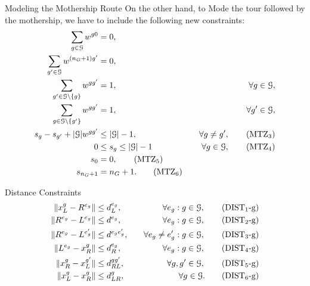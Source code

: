 \documentclass[slidestop,usepdftitle=false,10pt]{beamer}
\begin{document}
	\begin{frame}{Modeling the Mothership Route}
	On the other hand, to Mode the tour followed by the mothership, we have to include the following new constraints:
	    \begin{align}
	        \small
            \sum_{g\in\mathcal G} w^{g0} & = 0, \label{TOrig}\\
            \sum_{g'\in\mathcal G} w^{(n_G+1) g'} & = 0, \label{TDest}\\
            \sum_{g'\in\mathcal G\setminus\{g\}} w^{gg'} & = 1, \label{TExt} &\quad\forall g\in \mathcal G,\\
            \sum_{g\in\mathcal G\setminus\{g'\}} w^{gg'} & = 1, &\quad\forall g'\in \mathcal G,\label{TEnt}\\
            s_g - s_{g'} + |\mathcal G|w^{gg'} & \leq |\mathcal G| - 1  , &\quad\forall g \neq g', \tag{MTZ$_3$} \label{MTZ3}\\
            0 & \leq s_g \leq |\mathcal G| - 1 &\quad\forall g\in \mathcal G,\tag{MTZ$_4$}\label{MTZ4}\\
            s_0 & = 0, \tag{MTZ$_5$}\label{MTZ5}\\
            s_{n_G+1}&=n_G+1. \tag{MTZ$_6$}\label{MTZ6}
        \end{align}
	\end{frame}
	
	\begin{frame}{Distance Constraints}
	    \begin{align*}
        \|x_L^g- R^{e_g}\| &\leq d_L^{e_g},&\quad \forall e_g:g\in\mathcal G, \tag{DIST$_{1}$-g} \label{eq:d1g}\\
        \|R^{e_g}- L^{e_g}\| &\leq d^{e_g},&\quad \forall e_g:g\in\mathcal G, \tag{DIST$_{2}$-g}\\
        \|R^{e_g}- L^{e^\prime_g}\| &\leq d^{e_ge^\prime_g},&\quad \forall e_g\neq e'_g:g\in\mathcal G, \tag{DIST$_{3}$-g}\\
         \|L^{e_g}- x_R^g\| &\leq d_R^{e_g},&\quad \forall e_g:g\in\mathcal G, \tag{DIST$_{4}$-g}\\
        \|x_R^g- x_L^{g'}\| &\leq d^{gg'}_{RL},& \quad \forall g,g'\in\mathcal G, \tag{DIST$_{5}$-g}\\
        \|x_L^g- x_R^g\| &\leq d^g_{LR},& \quad \forall g\in\mathcal G. \tag{DIST$_{6}$-g} \label{eq:d6g}\\
        \end{align*}
	\end{frame}
	
\end{document}
